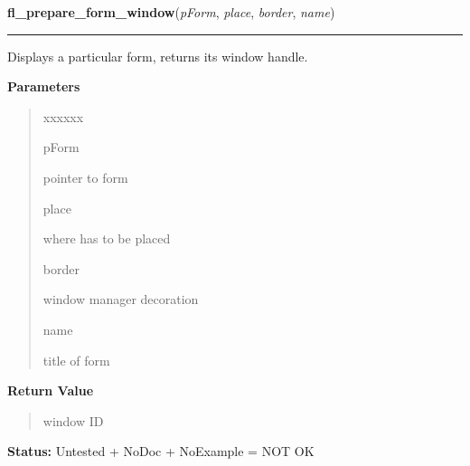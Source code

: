 \hspace{.8\funcindent}\begin{boxedminipage}{\funcwidth}

    \raggedright \textbf{fl\_prepare\_form\_window}(\textit{pForm}, \textit{place}, \textit{border}, \textit{name})

    \vspace{-1.5ex}

    \rule{\textwidth}{0.5\fboxrule}
\setlength{\parskip}{2ex}
    Displays a particular form, returns its window handle.

\setlength{\parskip}{1ex}
      \textbf{Parameters}
      \vspace{-1ex}

      \begin{quote}
        \begin{Ventry}{xxxxxx}

          \item[pForm]

          pointer to form

          \item[place]

          where has to be placed

          \item[border]

          window manager decoration

          \item[name]

          title of form

        \end{Ventry}

      \end{quote}

      \textbf{Return Value}
    \vspace{-1ex}

      \begin{quote}
      window ID

      \end{quote}

\textbf{Status:} Untested + NoDoc + NoExample = NOT OK



    \end{boxedminipage}

    \label{xformslib:library:fl_show_form_window}

